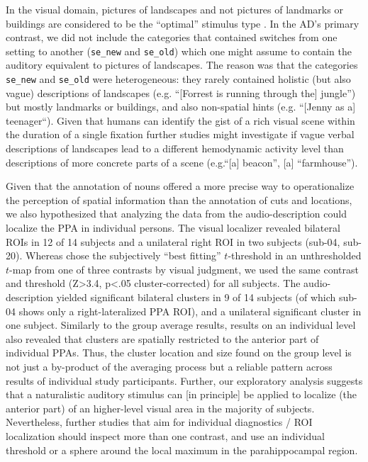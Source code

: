 \documentclass[english]{article}
\begin{document}

In the visual domain, pictures of landscapes and not pictures of landmarks or
buildings are considered to be the ``optimal'' stimulus type
\citep{epstein2008parahippocampal}.
In the AD's primary contrast, we did not include the categories that contained
switches from one setting to another (\texttt{se\_new} and \texttt{se\_old})
which one might assume to contain the auditory equivalent to pictures of
landscapes.
The reason was that the categories \texttt{se\_new} and \texttt{se\_old} were
heterogeneous: they rarely contained holistic (but also vague) descriptions of
landscapes (e.g.  ``[Forrest is running through the] jungle'') but mostly
landmarks or buildings, and also non-spatial hints (e.g. ``[Jenny as a]
teenager``).
Given that humans can identify the gist of a rich visual scene within the
duration of a single fixation \citep{henderson2003human} further studies might
investigate if vague verbal descriptions of landscapes lead to a different
hemodynamic activity level than descriptions of more concrete parts of a scene
(e.g.``[a] beacon'', [a] ``farmhouse'').


Given that the annotation of nouns offered a more precise way to operationalize
the perception of spatial information than the annotation of cuts and locations,
we also hypothesized that analyzing the data from the audio-description could
localize the PPA in individual persons.
The visual localizer \citep{sengupta2016extension} revealed bilateral ROIs in 12
of 14 subjects and a unilateral right ROI in two subjects (sub-04, sub-20).
%
Whereas \citep{sengupta2016extension} chose the subjectively ``best fitting''
$t$-threshold in an unthresholded $t$-map from one of three contrasts by visual
judgment, we used the same contrast and threshold (Z>3.4, p<.05
cluster-corrected) for all subjects.
The audio-description yielded significant bilateral clusters in 9 of 14 subjects
(of which sub-04 shows only a right-lateralized PPA ROI), and a unilateral
significant cluster in one subject.
Similarly to the group average results, results on an individual level also
revealed that clusters are spatially restricted to the anterior part of
individual PPAs.
Thus, the cluster location and size found on the group level is not just a
by-product of the averaging process but a reliable pattern across results of
individual study participants.
Further, our exploratory analysis suggests that a naturalistic auditory stimulus
can [in principle] be applied to localize (the anterior part) of an higher-level
visual area in the majority of subjects.
Nevertheless, further studies that aim for individual diagnostics / ROI
localization should inspect more than one contrast, and use an individual
threshold or a sphere around the local maximum \citep{poldrack2007region} in the
parahippocampal region.
\end{document}
